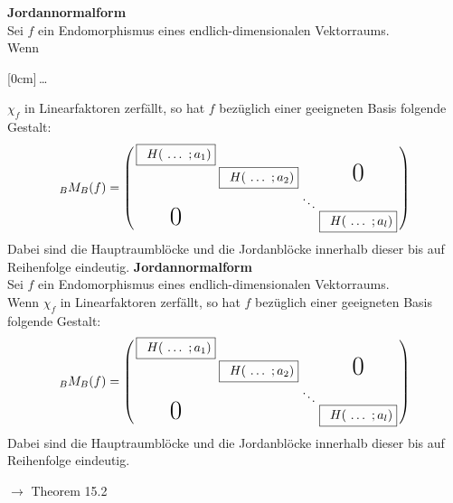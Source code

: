\documentclass[11pt]{article}
\renewcommand{\cite}[1]{\par\bigskip\hfill{\color{gray}\tiny\(\to\) #1}}
\newcommand{\hide}[1]{\parbox{0cm}{\raisebox{-7pt}[0cm]{\dots}}\color{white}#1\color{black}}
\let\olddots\dots
\renewcommand{\dots}{\,\olddots\,}
\newenvironment{field}{}{\newpage}
\newif\ifnote
\newenvironment{note}{\notetrue}{\notefalse}
\begin{document}
\begin{note}
    \begin{field}
        \setlength{\fboxsep}{0pt}
        \textbf{Jordannormalform}\\
        Sei $f$ ein Endomorphismus eines endlich-dimensionalen Vektorraums.\\
        Wenn \hide{$\chi_f$ in Linearfaktoren zerfällt}, so hat $f$ bezüglich einer geeigneten Basis folgende Gestalt:
        \[_B M_B(f) = \left(\begin{smallmatrix}
        \fbox{\, $H(\dots;a_1)$}\\
        &\fbox{\, $H(\dots;a_2)$}&&\smash{\text{\huge 0}}\\
        &&\ddots\\
        \smash{\text{\huge 0}}&&&\fbox{\, $H(\dots;a_l)$}
        \end{smallmatrix}\right)\]
        Dabei sind die Hauptraumblöcke und die Jordanblöcke innerhalb dieser bis auf Reihenfolge eindeutig.
    \end{field}
    \begin{field}
        \setlength{\fboxsep}{0pt}
        \textbf{Jordannormalform}\\
        Sei $f$ ein Endomorphismus eines endlich-dimensionalen Vektorraums.\\
        Wenn $\chi_f$ in Linearfaktoren zerfällt, so hat $f$ bezüglich einer geeigneten Basis folgende Gestalt:
        \[_B M_B(f) = \left(\begin{smallmatrix}
        \fbox{\, $H(\dots;a_1)$}\\
        &\fbox{\, $H(\dots;a_2)$}&&\smash{\text{\huge 0}}\\
        &&\ddots\\
        \smash{\text{\huge 0}}&&&\fbox{\, $H(\dots;a_l)$}
        \end{smallmatrix}\right)\]
        Dabei sind die Hauptraumblöcke und die Jordanblöcke innerhalb dieser bis auf Reihenfolge eindeutig.
        \cite{Theorem 15.2}
    \end{field}
\end{note}
\end{document}
